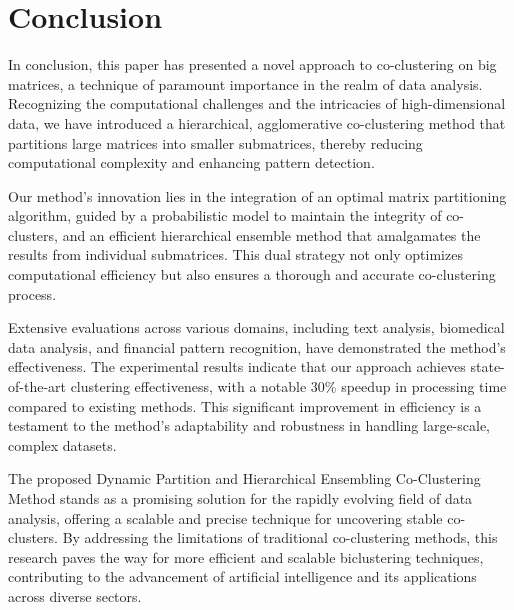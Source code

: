 
\section{Conclusion}
\label{sec:conclude}

In conclusion, this paper has presented a novel approach to co-clustering on big matrices, a technique of paramount importance in the realm of data analysis. Recognizing the computational challenges and the intricacies of high-dimensional data, we have introduced a hierarchical, agglomerative co-clustering method that partitions large matrices into smaller submatrices, thereby reducing computational complexity and enhancing pattern detection.

Our method's innovation lies in the integration of an optimal matrix partitioning algorithm, guided by a probabilistic model to maintain the integrity of co-clusters, and an efficient hierarchical ensemble method that amalgamates the results from individual submatrices. This dual strategy not only optimizes computational efficiency but also ensures a thorough and accurate co-clustering process.

Extensive evaluations across various domains, including text analysis, biomedical data analysis, and financial pattern recognition, have demonstrated the method's effectiveness. The experimental results indicate that our approach achieves state-of-the-art clustering effectiveness, with a notable 30\% speedup in processing time compared to existing methods. This significant improvement in efficiency is a testament to the method's adaptability and robustness in handling large-scale, complex datasets.

The proposed Dynamic Partition and Hierarchical Ensembling Co-Clustering Method stands as a promising solution for the rapidly evolving field of data analysis, offering a scalable and precise technique for uncovering stable co-clusters. By addressing the limitations of traditional co-clustering methods, this research paves the way for more efficient and scalable biclustering techniques, contributing to the advancement of artificial intelligence and its applications across diverse sectors.

